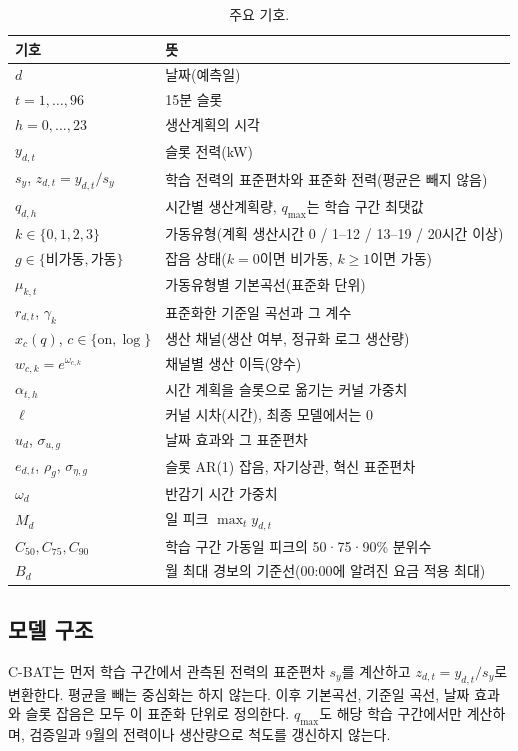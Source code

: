 \begin{table}[htbp]
\centering
\caption{주요 기호.}
\label{tab:ch2-notation}
\small
\begin{tabular}{ll}
\toprule
기호 & 뜻 \\
\midrule
$d$ & 날짜(예측일) \\
$t=1,\dots,96$ & 15분 슬롯 \\
$h=0,\dots,23$ & 생산계획의 시각 \\
$y_{d,t}$ & 슬롯 전력(kW) \\
$s_y$, $z_{d,t}=y_{d,t}/s_y$ & 학습 전력의 표준편차와 표준화 전력(평균은 빼지 않음) \\
$q_{d,h}$ & 시간별 생산계획량, $q_{\max}$는 학습 구간 최댓값 \\
$k\in\{0,1,2,3\}$ & 가동유형(계획 생산시간 0 / 1--12 / 13--19 / 20시간 이상) \\
$g\in\{\text{비가동},\text{가동}\}$ & 잡음 상태($k=0$이면 비가동, $k\ge1$이면 가동) \\
$\mu_{k,t}$ & 가동유형별 기본곡선(표준화 단위) \\
$r_{d,t}$, $\gamma_k$ & 표준화한 기준일 곡선과 그 계수 \\
$x_c(q)$, $c\in\{\mathrm{on},\log\}$ & 생산 채널(생산 여부, 정규화 로그 생산량) \\
$w_{c,k}=e^{\omega_{c,k}}$ & 채널별 생산 이득(양수) \\
$\alpha_{t,h}$ & 시간 계획을 슬롯으로 옮기는 커널 가중치 \\
$\ell$ & 커널 시차(시간), 최종 모델에서는 0 \\
$u_d$, $\sigma_{u,g}$ & 날짜 효과와 그 표준편차 \\
$e_{d,t}$, $\rho_g$, $\sigma_{\eta,g}$ & 슬롯 AR(1) 잡음, 자기상관, 혁신 표준편차 \\
$\omega_d$ & 반감기 시간 가중치 \\
$M_d$ & 일 피크 $\max_t y_{d,t}$ \\
$C_{50}, C_{75}, C_{90}$ & 학습 구간 가동일 피크의 50·75·90\% 분위수 \\
$B_d$ & 월 최대 경보의 기준선(00:00에 알려진 요금 적용 최대) \\
\bottomrule
\end{tabular}
\end{table}

\subsection{모델 구조}
\label{sec:ch2-model}

C-BAT는 먼저 학습 구간에서 관측된 전력의 표준편차 $s_y$를 계산하고 $z_{d,t}=y_{d,t}/s_y$로 변환한다. 평균을 빼는 중심화는 하지 않는다. 이후 기본곡선, 기준일 곡선, 날짜 효과와 슬롯 잡음은 모두 이 표준화 단위로 정의한다. $q_{\max}$도 해당 학습 구간에서만 계산하며, 검증일과 9월의 전력이나 생산량으로 척도를 갱신하지 않는다.

